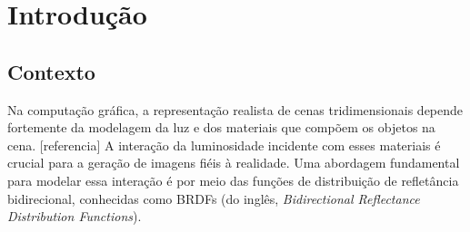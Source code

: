 \documentclass[english, 
               brazil, 
               bsc] %
               {dcomp-abntex2}
\begin{document}

\frenchspacing 


\pretextual



\inserirInformacoesPDF

\imprimircapa
\imprimirfolhaderosto*

% 
% 
% 

% 


 
% 
% 
    
\mostrarSUMARIO


\textual

\chapter{Introdução}
\label{introduction}


\section{Contexto}

Na computação gráfica, a representação realista de cenas tridimensionais depende fortemente da modelagem da luz e dos materiais que compõem os objetos na cena. [referencia] A interação da luminosidade incidente com esses materiais é crucial para a geração de imagens fiéis à realidade. Uma abordagem fundamental para modelar essa interação é por meio das funções de distribuição de refletância bidirecional, conhecidas como BRDFs (do inglês, \textit{Bidirectional Reflectance Distribution Functions}).
\end{document}
